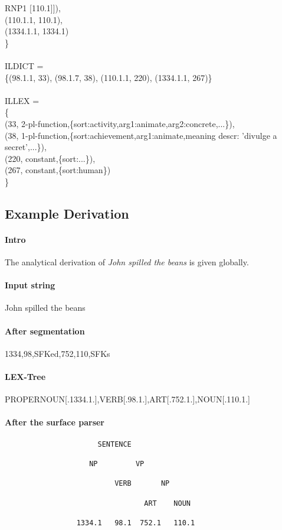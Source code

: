 \begin{tabbing}
RNP1 [110.1]]),\\
\> \> (110.1.1, 110.1),\\
\> \> (1334.1.1, 1334.1)\\
\> \> \}\\ \\
\> ILDICT =\\
\> \> \{(98.1.1, 33), (98.1.7, 38), (110.1.1, 220), (1334.1.1, 267)\}\\ \\
\> ILLEX =\\
\> \> \{\\
\> \> (33, 2-pl-function,\{sort:activity,arg1:animate,arg2:concrete,...\}),\\
\> \> (38, 1-pl-function,\{sort:achievement,arg1:animate,meaning descr: 
'divulge a secret',...\}),\\
\> \> (220, constant,\{sort:...\}),\\
\> \> (267, constant,\{sort:human\})\\
\> \> \}
\end{tabbing}

\subsection{Example Derivation}
\paragraph{Intro}
The analytical derivation of {\em John spilled the beans} is given globally.

\paragraph{Input string} 
John spilled the beans

\paragraph{After segmentation} 
1334,98,SFKed,752,110,SFKs

\paragraph{LEX-Tree} 
PROPERNOUN[.1334.1.],VERB[.98.1.],ART[.752.1.],NOUN[.110.1.]

\paragraph{After the surface parser}
\begin{verbatim}
                      SENTENCE
 
                    NP         VP

                          VERB       NP

                                 ART    NOUN

                 1334.1   98.1  752.1   110.1
\end{verbatim}
